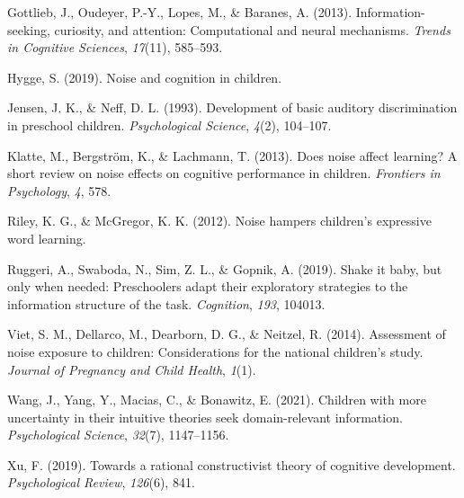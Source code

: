 \documentclass[10pt, letterpaper]{article}
\begin{document}
\leavevmode\hypertarget{ref-gottlieb2013}{}%
Gottlieb, J., Oudeyer, P.-Y., Lopes, M., \& Baranes, A. (2013).
Information-seeking, curiosity, and attention: Computational and neural
mechanisms. \emph{Trends in Cognitive Sciences}, \emph{17}(11),
585--593.

\leavevmode\hypertarget{ref-hygge2019}{}%
Hygge, S. (2019). Noise and cognition in children.

\leavevmode\hypertarget{ref-jensen1993}{}%
Jensen, J. K., \& Neff, D. L. (1993). Development of basic auditory
discrimination in preschool children. \emph{Psychological Science},
\emph{4}(2), 104--107.

\leavevmode\hypertarget{ref-klatte2013}{}%
Klatte, M., Bergström, K., \& Lachmann, T. (2013). Does noise affect
learning? A short review on noise effects on cognitive performance in
children. \emph{Frontiers in Psychology}, \emph{4}, 578.

\leavevmode\hypertarget{ref-riley2012}{}%
Riley, K. G., \& McGregor, K. K. (2012). Noise hampers children's
expressive word learning.

\leavevmode\hypertarget{ref-ruggeri2019}{}%
Ruggeri, A., Swaboda, N., Sim, Z. L., \& Gopnik, A. (2019). Shake it
baby, but only when needed: Preschoolers adapt their exploratory
strategies to the information structure of the task. \emph{Cognition},
\emph{193}, 104013.

\leavevmode\hypertarget{ref-viet2014}{}%
Viet, S. M., Dellarco, M., Dearborn, D. G., \& Neitzel, R. (2014).
Assessment of noise exposure to children: Considerations for the
national children's study. \emph{Journal of Pregnancy and Child Health},
\emph{1}(1).

\leavevmode\hypertarget{ref-wang2021}{}%
Wang, J., Yang, Y., Macias, C., \& Bonawitz, E. (2021). Children with
more uncertainty in their intuitive theories seek domain-relevant
information. \emph{Psychological Science}, \emph{32}(7), 1147--1156.

\leavevmode\hypertarget{ref-xu2019}{}%
Xu, F. (2019). Towards a rational constructivist theory of cognitive
development. \emph{Psychological Review}, \emph{126}(6), 841.


\end{document}
